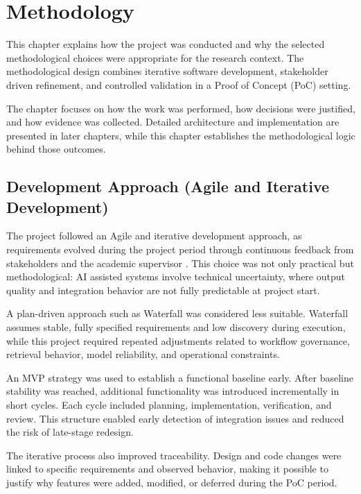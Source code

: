 \chapter{Methodology}

This chapter explains how the project was conducted and why the selected methodological choices were appropriate for the research context.
The methodological design combines iterative software development, stakeholder driven refinement, and controlled validation in a Proof of Concept (PoC) setting.

The chapter focuses on how the work was performed, how decisions were justified, and how evidence was collected.
Detailed architecture and implementation are presented in later chapters, while this chapter establishes the methodological logic behind those outcomes.

\section{Development Approach (Agile and Iterative Development)}

The project followed an Agile and iterative development approach, as requirements evolved during the project period through continuous feedback from stakeholders and the academic supervisor \cite{agile_manifesto}.
This choice was not only practical but methodological: AI assisted systems involve technical uncertainty, where output quality and integration behavior are not fully predictable at project start.

A plan-driven approach such as Waterfall was considered less suitable.
Waterfall assumes stable, fully specified requirements and low discovery during execution, while this project required repeated adjustments related to workflow governance, retrieval behavior, model reliability, and operational constraints.

\vspace{0.4cm}

An MVP strategy was used to establish a functional baseline early.
After baseline stability was reached, additional functionality was introduced incrementally in short cycles.
Each cycle included planning, implementation, verification, and review.
This structure enabled early detection of integration issues and reduced the risk of late-stage redesign.

The iterative process also improved traceability.
Design and code changes were linked to specific requirements and observed behavior, making it possible to justify why features were added, modified, or deferred during the PoC period.

